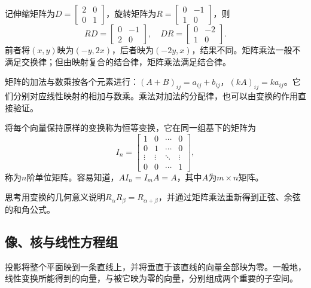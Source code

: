 记伸缩矩阵为\(D = \left[ \begin{matrix}2 & 0 \\ 0 & 1\end{matrix} \right]\)，旋转矩阵为\(R = \left[ \begin{matrix}0 & - 1 \\ 1 & 0\end{matrix} \right]\)，则
\begin{equation}
    R D = \left[ \begin{matrix}0 & - 1 \\ 2 & 0\end{matrix} \right] ,
    \quad
    D R = \left[ \begin{matrix}0 & - 2 \\ 1 & 0\end{matrix} \right] .
\end{equation}
前者将\(\left( x , y \right)\)映为\(\left( - y , 2 x \right)\)，后者映为\(\left( - 2 y , x \right)\)，结果不同。矩阵乘法一般不满足交换律；但由映射复合的结合律，矩阵乘法满足结合律。

矩阵的加法与数乘按各个元素进行：\(\left( A + B \right)_{i j} = a_{i j} + b_{i j}\)，\(\left( k A \right)_{i j} = k a_{i j}\)。它们分别对应线性映射的相加与数乘。乘法对加法的分配律，也可以由变换的作用直接验证。

将每个向量保持原样的变换称为恒等变换，它在同一组基下的矩阵为
\begin{equation}
    I_{n} = \left[ \begin{matrix}
        1 & 0 & \cdots & 0 \\
        0 & 1 & \cdots & 0 \\
        \vdots & \vdots & \ddots & \vdots \\
        0 & 0 & \cdots & 1
    \end{matrix} \right] ,
\end{equation}
称为\(n\)阶单位矩阵。容易知道，\(A I_{n} = I_{m} A = A\)，其中\(A\)为\(m \times n\)矩阵。

{\kaiti{}思考\quad 用变换的几何意义说明\(R_{\alpha} R_{\beta} = R_{\alpha + \beta}\)，并通过矩阵乘法重新得到正弦、余弦的和角公式。}

\subsection{像、核与线性方程组}
投影将整个平面映到一条直线上，并将垂直于该直线的向量全部映为零。一般地，线性变换所能得到的向量，与被它映为零的向量，分别组成两个重要的子空间。

